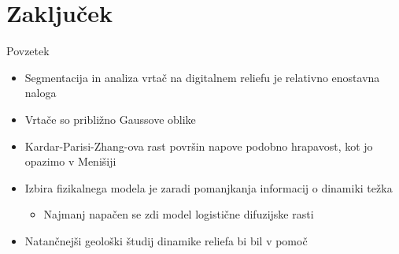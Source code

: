 \documentclass{beamer}
\begin{document}
\section*{Zaključek}

\begin{frame}{Povzetek}
  \begin{itemize}
  \item<1->
    Segmentacija in analiza vrtač na digitalnem reliefu je relativno enostavna naloga
  \item<2->
    Vrtače so približno Gaussove oblike
  \item<3->
    Kardar-Parisi-Zhang-ova rast površin napove podobno hrapavost, kot jo opazimo v Menišiji
  \item<4->
    Izbira fizikalnega modela je zaradi pomanjkanja informacij o dinamiki težka
    \begin{itemize}
      \item<5->
        Najmanj napačen se zdi model logistične difuzijske rasti
    \end{itemize}
    \item<6->
      Natančnejši geološki študij dinamike reliefa bi bil v pomoč
  \end{itemize}
\end{frame}

\end{document}
